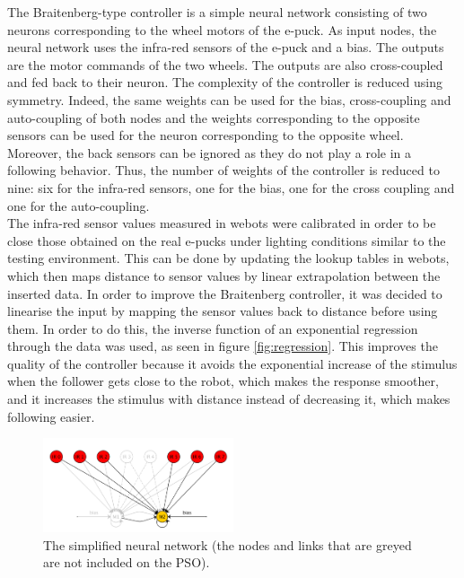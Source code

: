 \documentclass[a4paper, 10pt, conference]{ieeeconf}      %
\begin{document}
The Braitenberg-type controller is a simple neural network consisting of two neurons corresponding to the wheel motors of the e-puck. As input nodes, the neural network uses the infra-red sensors of the e-puck  and a bias. The outputs are the motor commands of the two wheels. The outputs are also cross-coupled and fed back to their neuron. The complexity of the controller is reduced using symmetry. Indeed, the same weights can be used for the bias, cross-coupling and auto-coupling of both nodes and the weights corresponding to the opposite sensors can be used for the neuron corresponding to the opposite wheel. Moreover, the back sensors can be ignored as they do not play a role in a following behavior. Thus, the number of weights of the controller is reduced to nine: six for the infra-red sensors, one for the bias, one for the cross coupling and one for the auto-coupling.\\
The infra-red sensor values measured in webots were calibrated in order to be close those obtained on the real e-pucks under lighting conditions similar to the testing environment. This can be done by updating the lookup tables in webots, which then maps distance to sensor values by linear extrapolation between the inserted data. In order to improve the Braitenberg controller, it was decided to linearise the input by mapping the sensor values back to distance before using them. In order to do this, the inverse function of an exponential regression through the data was used, as seen in figure \ref{fig:regression}. This improves the quality of the controller because it avoids the exponential increase of the stimulus when the follower gets close to the robot, which makes the response smoother, and it increases the stimulus with distance instead of decreasing it, which makes following easier.\\

\begin{figure}[thpb]
      \centering
      \includegraphics[width = 0.5\textwidth]{images/NNsimplified.png}
      \caption{The simplified neural network (the nodes and links that are greyed are not included on the PSO).}
      \label{fig:nnsimplified}
\end{figure}
\end{document}
